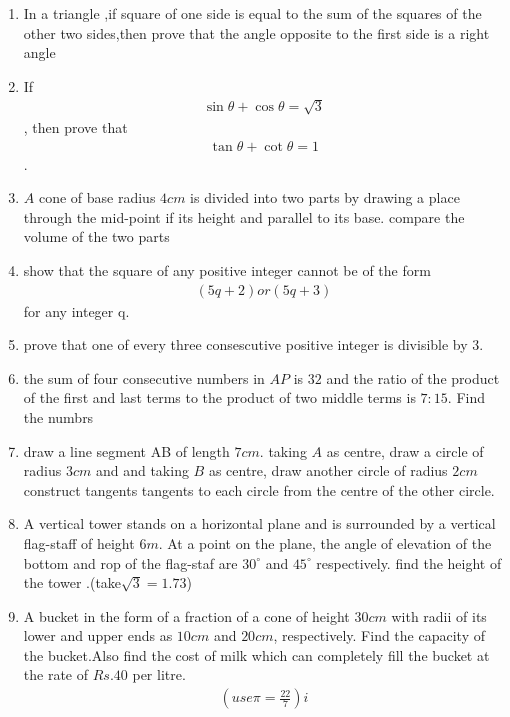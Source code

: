 \documentclass[12pt,-letter paper]{article}
\providecommand{\brak}[1]{\ensuremath{\left(#1\right)}i}
\begin{document}
\begin{enumerate}
       \item In a triangle ,if square of one side is equal to the sum of the squares of the other two sides,then prove that the angle opposite to the first side is a right angle
       \item If \begin{align}\sin \theta + \cos \theta = \sqrt{3}\end{align}, then prove that \begin{align}\tan \theta + \cot \theta = 1\end{align}.
       \item $A$ cone of base radius $4cm$ is divided into two parts by drawing a place through the mid-point if its height and parallel to its base. compare the volume of the two parts 
       \item show that the square of any positive integer cannot be of the form \begin{align}(5q+2) or (5q+3)\end{align} for any integer q.
       \item prove that one of every  three consescutive positive integer is divisible by $3$.
       \item the sum of four consecutive numbers in $AP$ is $32$ and the ratio of the product of the first and last terms to the product of two middle terms is $7:15$. Find the numbrs 
       \item draw a line segment AB of length $7cm$. taking $A$ as centre, draw a circle of radius $3cm$ and and taking $B$ as centre, draw another circle of radius $2cm$ construct tangents tangents to each circle from the centre of the other circle.
       \item A vertical tower stands on a horizontal plane and is surrounded by a vertical flag-staff of height $6m$. At a point on the plane, the angle of elevation of the bottom and rop of the flag-staf are $30^\circ$ and $45^\circ$ respectively. find the height of the tower .(take$\sqrt{3}=1.73$)
       \item A bucket in the form of a fraction of a cone of height $30cm$ with radii of its lower and upper ends as $10cm$ and $20cm$, respectively. Find the capacity of the bucket.Also find the cost of milk which can completely fill the bucket at the rate of $Rs.40$ per litre. \begin{align}\brak {use\pi=\frac{22}{7}}\end{align}



\end{enumerate}
\end{document}
